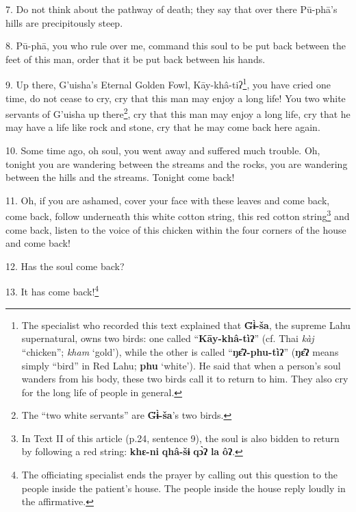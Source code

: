 7. Do not think about the pathway of death; they say that over there Pū-phā's
hills are precipitously steep.

8. Pū-phā, you who rule over me, command this soul to be put back between the
feet of this man, order that it be put back between his hands.

9. Up there, G'uisha's Eternal Golden Fowl, Kāy-khâ-tiʔ\footnote{The specialist who recorded this text explained that \textbf{G̈ɨ̀-ša}, the supreme Lahu supernatural, owns two birds: one called ``\textbf{Kāy-khâ-tìʔ}'' (cf. Thai \textit{kàj} ``chicken''; \textit{kham} `gold'), while the other is called ``\textbf{ŋɛ̂ʔ-phu-tìʔ}'' (\textbf{ŋɛ̂ʔ} means simply ``bird'' in Red Lahu; \textbf{phu} `white'). He said that when a person's soul wanders from his body, these two birds call it to return to him. They also cry for the long life of people in general.}, you have cried
one time, do not cease to cry, cry that this man may enjoy a long life! You two
white servants of G'uisha up there\footnote{The ``two white servants'' are \textbf{G̈ɨ̀-ša}'s two birds.}, cry that this man may enjoy a long life,
cry that he may have a life like rock and stone, cry that he may come back here
again.

10. Some time ago, oh soul, you went away and suffered much trouble. Oh, tonight
you are wandering between the streams and the rocks, you are wandering between
the hills and the streams. Tonight come back!

11. Oh, if you are ashamed, cover your face with these leaves and come back, come
back, follow underneath this white cotton string, this red cotton string\footnote{In Text II of this article (p.24, sentence 9), the soul is also bidden to return by following a red string: \textbf{khɛ-ni} \textbf{qhâ-šɨ} \textbf{qɔ̀ʔ} \textbf{la} \textbf{ôʔ}.}
and come back, listen to the voice of this chicken within the four corners of the
house and come back!

12. Has the soul come back?

13. It has come back!\footnote{The officiating specialist ends the prayer by calling out this question to the people inside the patient's house. The people inside the house reply loudly in the affirmative.}

